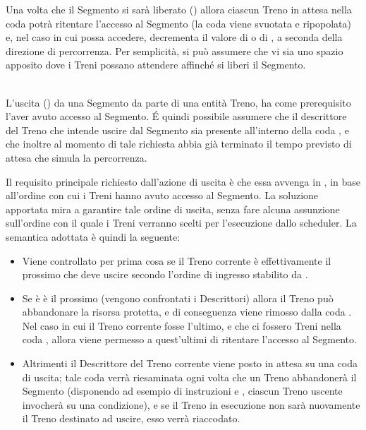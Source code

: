 \begin{description}
			Una volta che il Segmento si sarà liberato () allora ciascun Treno in attesa nella coda  potrà ritentare l'accesso al Segmento (la coda viene svuotata e ripopolata) e, nel caso in cui possa accedere, decrementa il valore di  o di , a seconda della direzione di percorrenza.
			Per semplicità, si può assumere che vi sia uno spazio apposito dove i Treni possano attendere affinché si liberi il Segmento.
			  
			\item {} \\ 
			
			L'uscita () da una Segmento da parte di una entità Treno, ha come prerequisito l'aver avuto accesso al Segmento. \'E quindi possibile assumere che il descrittore del Treno che intende uscire dal Segmento sia presente all'interno della coda , e che inoltre al momento di tale richiesta abbia già terminato il tempo previsto di attesa che simula la percorrenza.
			
			Il requisito principale richiesto dall'azione di uscita è che essa avvenga in , in base all'ordine con cui i Treni hanno avuto accesso al Segmento. La soluzione apportata mira a garantire tale ordine di uscita, senza fare alcuna assunzione sull'ordine con il quale i Treni verranno scelti per l'esecuzione dallo scheduler. La semantica adottata è quindi la seguente:
			\begin{itemize}
				 \item Viene controllato per prima cosa se il Treno corrente è effettivamente il prossimo che deve uscire secondo l'ordine di ingresso stabilito da .
				 \item Se è è il prossimo (vengono confrontati i Descrittori) allora il Treno può abbandonare la risorsa protetta, e di conseguenza viene rimosso dalla coda . Nel caso in cui il Treno corrente fosse l'ultimo, e che ci fossero Treni nella coda , allora viene permesso a quest'ultimi di ritentare l'accesso al Segmento.
				 \item Altrimenti il Descrittore del Treno corrente viene posto in attesa su una coda di uscita; tale coda verrà riesaminata ogni volta che un Treno abbandonerà il Segmento (disponendo ad esempio di instruzioni  e , ciascun Treno uscente invocherà  su una condizione), e se il Treno in esecuzione non sarà nuovamente il Treno destinato ad uscire, esso verrà riaccodato. 
			\end{itemize}
		\end {description}
	
